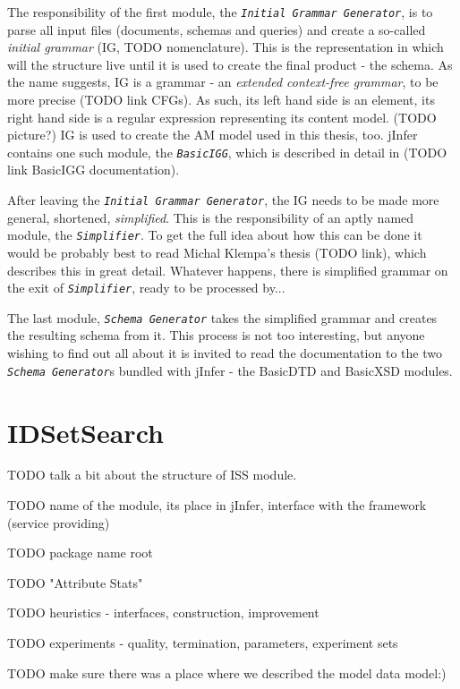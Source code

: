 \documentclass[a4paper,12pt,oneside]{report}
\newcommand{\jmodule}[1]{\texttt{\textit{#1}}}
\theoremstyle{definition}
\begin{document}
The responsibility of the first module, the \jmodule{Initial Grammar Generator}, is to parse all input files (documents, schemas and queries) and create a so-called \textit{initial grammar} (IG, TODO nomenclature). This is the representation in which will the structure live until it is used to create the final product - the schema. As the name suggests, IG is a grammar - an \textit{extended context-free grammar}, to be more precise (TODO link CFGs). As such, its left hand side is an element, its right hand side is a regular expression representing its content model. (TODO picture?) IG is used to create the AM model used in this thesis, too. jInfer contains one such module, the \jmodule{BasicIGG}, which is described in detail in (TODO link BasicIGG documentation).

After leaving the \jmodule{Initial Grammar Generator}, the IG needs to be made more general, shortened, \textit{simplified}. This is the responsibility of an aptly named module, the \jmodule{Simplifier}. To get the full idea about how this can be done it would be probably best to read Michal Klempa's thesis (TODO link), which describes this in great detail. Whatever happens, there is simplified grammar on the exit of \jmodule{Simplifier}, ready to be processed by...

The last module, \jmodule{Schema Generator} takes the simplified grammar and creates the resulting schema from it. This process is not too interesting, but anyone wishing to find out all about it is invited to read the documentation to the two \jmodule{Schema Generator}s bundled with jInfer - the BasicDTD and BasicXSD modules.

\chapter{IDSetSearch}
\label{appendix-iss}

TODO talk a bit about the structure of ISS module.

TODO name of the module, its place in jInfer, interface with the framework (service providing)

TODO package name root

TODO "Attribute Stats"

TODO heuristics - interfaces, construction, improvement

TODO experiments - quality, termination, parameters, experiment sets

TODO make sure there was a place where we described the model data model:)
\end{document}
